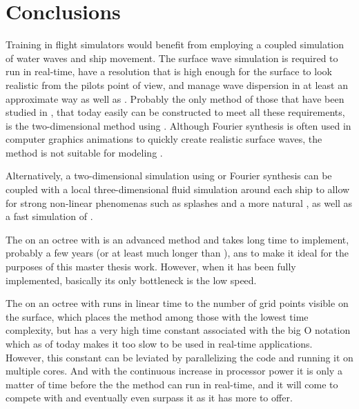 \chapter{Conclusions}

Training in flight simulators would benefit from employing a coupled simulation of water waves and ship movement. The surface wave simulation is required to run in real-time, have a resolution that is high enough for the surface to look realistic from the pilots point of view, and manage wave dispersion in at least an approximate way as well as \FSI. Probably the only method of those that have been studied in \thismasterthesiswork, that today easily can be constructed to meet all these requirements, is the two-dimensional method using \LPD. Although Fourier synthesis is often used in computer graphics animations to quickly create realistic surface waves, the method is not suitable for modeling \FSI.

Alternatively, a two-dimensional simulation using \LPD or Fourier synthesis can be coupled with a local three-dimensional fluid simulation around each ship to allow for strong non-linear phenomenas such as splashes and a more natural \FSI, as well as a fast simulation of .

The \FVM on an octree with \FSM is an advanced method and takes long time to implement, probably a few years (or at least much longer than \masterthesisworktime), ans to make it ideal for the purposes of this master thesis work. However, when it has been fully implemented, basically its only bottleneck is the low speed.

The \FVM on an octree with \FSM runs in linear time to the number of grid points visible on the surface, which places the method among those with the lowest time complexity, but has a very high time constant associated with the big O notation which as of today makes it too slow to be used in real-time applications. However, this constant can be leviated by parallelizing the code and running it on multiple cores. And with the continuous increase in processor power it is only a matter of time before the the method can run in real-time, and it will come to compete with \LPD and eventually even surpass it as it has more to offer.